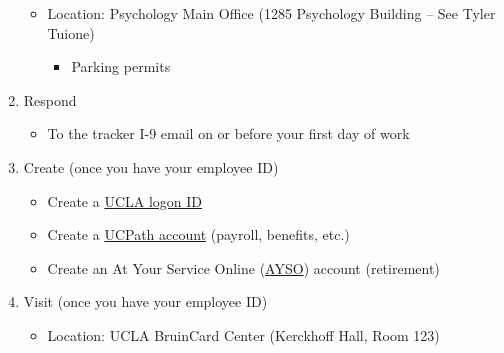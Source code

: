 \documentclass[]{book}
\providecommand{\tightlist}{%
  \setlength{\itemsep}{0pt}\setlength{\parskip}{0pt}}
\begin{document}
\begin{enumerate}
  \begin{itemize}
  \tightlist
  \item
    Location: Psychology Main Office (1285 Psychology Building -- See Tyler Tuione)

    \begin{itemize}
    \tightlist
    \item
      Parking permits
    \end{itemize}
  \end{itemize}
\item
  Respond

  \begin{itemize}
  \tightlist
  \item
    To the tracker I-9 email on or before your first day of work
  \end{itemize}
\item
  Create (once you have your employee ID)

  \begin{itemize}
  \tightlist
  \item
    Create a \href{https://accounts.iam.ucla.edu/\#/}{UCLA logon ID}
  \item
    Create a \href{https://idpproxy-ucpath.universityofcalifornia.edu/simplesaml/module.php/ucpathdiscovery/disco.php?entityID=https://ucpath.universityofcalifornia.edu\&return=https://idpproxy-ucpath.universityofcalifornia.edu/simplesaml/module.php/saml/sp/discoresp.php?AuthID=_6a3d8a7c8144ccec21e8fff0206d805c7b4d0beb08\%253Ahttps\%253A\%252F\%252Fidpproxy-ucpath.universityofcalifornia.edu\%252Fsimplesaml\%252Fsaml2\%252Fidp\%252FSSOService.php\%253Fspentityid\%253Dhttps\%25253A\%25252F\%25252Fucpath.universityofcalifornia.edu\%25253A443\%25252Fsimplesaml\%25252Fmodule.php\%25252Fsaml\%25252Fsp\%25252Fmetadata.php\%25252Fdefault-sp\%2526cookieTime\%253D1563390873\%2526RelayState\%253Dhttps\%25253A\%25252F\%25252Fucpath.universityofcalifornia.edu\%25252Fsaml_login\&returnIDParam=idpentityid}{UCPath account} (payroll, benefits, etc.)
  \item
    Create an At Your Service Online (\href{https://atyourserviceonline.ucop.edu/ayso/}{AYSO}) account (retirement)
  \end{itemize}
\item
  Visit (once you have your employee ID)

  \begin{itemize}
  \tightlist
  \item
    Location: UCLA BruinCard Center (Kerckhoff Hall, Room 123)


\end{itemize}
\end{enumerate}
\end{document}
